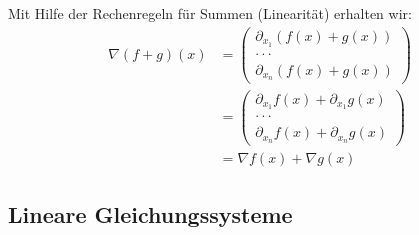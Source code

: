 \documentclass{article}
\begin{document}
Mit Hilfe der Rechenregeln für Summen (Linearität) erhalten wir:
%
\begin{align*}
    \nabla (f + g)(x) & = \left( \begin{array}{c} \partial_{x_1}(f(x) + g(x)) \\ \cdot \cdot \cdot \\ \partial_{x_n}(f(x) + g(x)) \end{array} \right) \\
    & = \left( \begin{array}{c} \partial_{x_1}f(x) + \partial_{x_1}g(x) \\ \cdot \cdot \cdot \\ \partial_{x_n}f(x) + \partial_{x_n}g(x) \end{array} \right) \\
    & = \nabla f(x) + \nabla g(x)
\end{align*}
%
\clearpage

\subsection{Lineare Gleichungssysteme}
\end{document}
